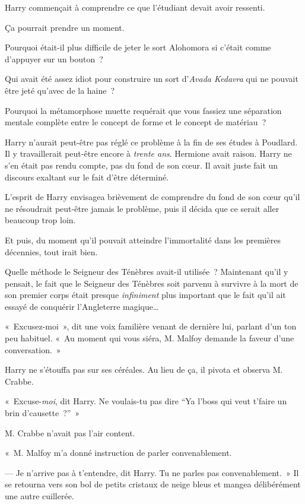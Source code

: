 Harry commençait à comprendre ce que l'étudiant devait avoir ressenti.

Ça pourrait prendre un moment.

Pourquoi était-il plus difficile de jeter le sort Alohomora si c'était comme d'appuyer sur un bouton~?

Qui avait été assez idiot pour construire un sort d'\emph{Avada Kedavra} qui ne pouvait être jeté qu'avec de la haine~?

Pourquoi la métamorphose muette requérait que vous fassiez une séparation mentale complète entre le concept de forme et le concept de matériau~?

Harry n'aurait peut-être pas réglé ce problème à la fin de ses études à Poudlard. Il y travaillerait peut-être encore à \emph{trente ans}. Hermione avait raison. Harry ne s'en était pas rendu compte, pas du fond de son cœur. Il avait juste fait un discours exaltant sur le fait d'être déterminé.

L'esprit de Harry envisagea brièvement de comprendre du fond de son cœur qu'il ne résoudrait peut-être jamais le problème, puis il décida que ce serait aller beaucoup trop loin.

Et puis, du moment qu'il pouvait atteindre l'immortalité dans les premières décennies, tout irait bien.

Quelle méthode le Seigneur des Ténèbres avait-il utilisée~? Maintenant qu'il y pensait, le fait que le Seigneur des Ténèbres soit parvenu à survivre à la mort de son premier corps était presque \emph{infiniment} plus important que le fait qu'il ait essayé de conquérir l'Angleterre magique…

«~Excusez-moi~», dit une voix familière venant de dernière lui, parlant d'un ton peu habituel. «~Au moment qui vous siéra, M. Malfoy demande la faveur d'une conversation.~»

Harry ne s'étouffa pas sur ses céréales. Au lieu de ça, il pivota et observa M. Crabbe.

«~Excuse-\emph{moi}, dit Harry. Ne voulais-tu pas dire “Ya l'boss qui veut t'faire un brin d'causette~?”~»

M. Crabbe n'avait pas l'air content.

«~M. Malfoy m'a donné instruction de parler convenablement.

--- Je n'arrive pas à t'entendre, dit Harry. Tu ne parles pas convenablement.~» Il se retourna vers son bol de petits cristaux de neige bleus et mangea délibérément une autre cuillerée.


